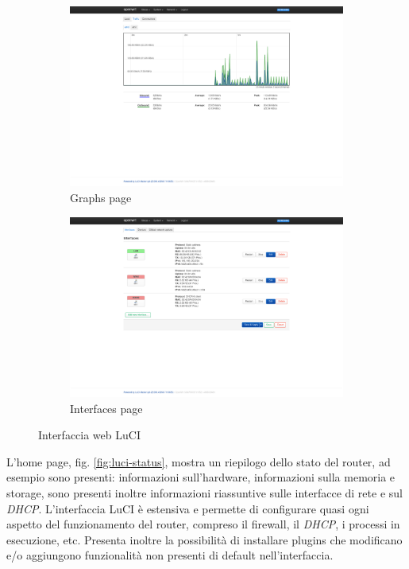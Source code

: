\begin{figure}[H]
    \begin{subfigure}{0.5\linewidth}
        \centering
        \includegraphics[height=0.65\linewidth]{immagini/LuCI_graphs}
        \caption{Graphs page}
        \label{fig:luci-graphs}
    \end{subfigure}%
    \hfill
    \begin{subfigure}{0.5\linewidth}
        \centering
        \includegraphics[height=0.65\linewidth]{immagini/LuCI_interfaces}
        \caption{Interfaces page}
        \label{fig:luci-interfaces}
    \end{subfigure}%
    \caption{Interfaccia web LuCI}
\end{figure}


L'home page, fig. \ref{fig:luci-status}, mostra un riepilogo dello stato del router, ad esempio sono presenti: informazioni sull'hardware, informazioni sulla memoria e storage, sono presenti inoltre informazioni riassuntive sulle interfacce di rete e sul \textit{DHCP}. L'interfaccia LuCI è estensiva e permette di configurare quasi ogni aspetto del funzionamento del router, compreso il firewall, il \textit{DHCP}, i processi in esecuzione, etc. Presenta inoltre la possibilità di installare plugins che modificano e/o aggiungono funzionalità non presenti di default nell'interfaccia.

